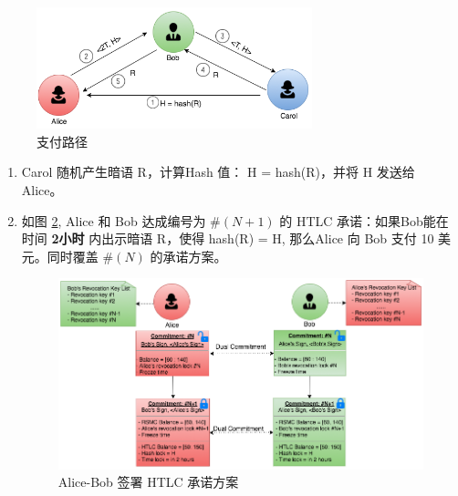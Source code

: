 \begin{figure}[h!]
    \centering
    \includegraphics[width=8cm, keepaspectratio]{../images/payment_path.png}
    \caption{支付路径}
    \label{fig:htlc_path}
\end{figure}


\begin{enumerate}
    \item Carol 随机产生暗语 R，计算Hash 值： H = hash(R)，并将 H 发送给 Alice。

    \item 如图 \ref{fig:htlc_alice_bob_2}, Alice 和 Bob 达成编号为 $\#(N+1)$ 的 HTLC 承诺：如果Bob能在时间 \textbf{2小时} 内出示暗语 R，使得 hash(R) = H, 那么Alice 向 Bob 支付 10 美元。同时覆盖 $\#(N)$ 的承诺方案。 
        \begin{figure}[h!]
            \centering
            \includegraphics[width=12cm, keepaspectratio]{../images/alice_bob_2.png}
            \caption{Alice-Bob 签署 HTLC 承诺方案}
            \label{fig:htlc_alice_bob_2}
        \end{figure}


\end{enumerate}
